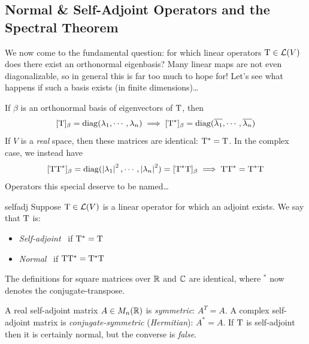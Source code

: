 \fi

\clearpage



\subsection{Normal \& Self-Adjoint Operators and the Spectral Theorem}

We now come to the fundamental question: for which linear operators $\mathrm{T}\in\mathcal{L}(V)$ does there exist an orthonormal eigenbasis? Many linear maps are not even diagonalizable, so in general this is far too much to hope for! Let's see what happens if such a basis exists (in finite dimensions)\ldots\medbreak

If $\beta$ is an orthonormal basis of eigenvectors of $\mathrm{T}$, then
\[
	[\mathrm{T}]_\beta=\operatorname{diag}(\lambda_1,\cdots,\lambda_n)
	\implies [\mathrm{T}^*]_\beta=\operatorname{diag}(\overline{\lambda_1},\cdots,\overline{\lambda_n})
\]
If $V$ is a \emph{real} space, then these matrices are identical: $\mathrm{T}^*=\mathrm{T}$. In the complex case, we instead have
\[
	[\mathrm{T}\mathrm{T}^*]_\beta=\operatorname{diag}(\left| \lambda_1\right|^2,\cdots,\left| \lambda_n\right|^2)=[\mathrm{T}^*\mathrm{T}]_\beta 
	\implies \mathrm{T}\mathrm{T}^*=\mathrm{T}^*\mathrm{T}
\]
Operators this special deserve to be named\ldots

\begin{defn}{}{selfadj}
	Suppose $\mathrm{T}\in\mathcal{L}(V)$ is a linear operator for which an adjoint exists. We say that $\mathrm{T}$ is:
	\begin{itemize}
		\item[]\emph{Self-adjoint} \ if $\mathrm{T}^*=\mathrm{T}$
		\item[]\emph{Normal} \ if $\mathrm{T}\mathrm{T}^*=\mathrm{T}^*\mathrm{T}$
	\end{itemize}
	The definitions for square matrices over $\mathbb{R}$ and $\mathbb{C}$ are identical, where $^*$ now denotes the conjugate-transpose.
\end{defn}

A real self-adjoint matrix $A\in M_n(\mathbb{R})$ is \emph{symmetric}: $A^T=A$. A complex self-adjoint matrix is \emph{conjugate-symmetric} (\emph{Hermitian}): $A^*=A$.\smallbreak
If $\mathrm{T}$ is self-adjoint then it is certainly normal, but the converse is \emph{false}.

